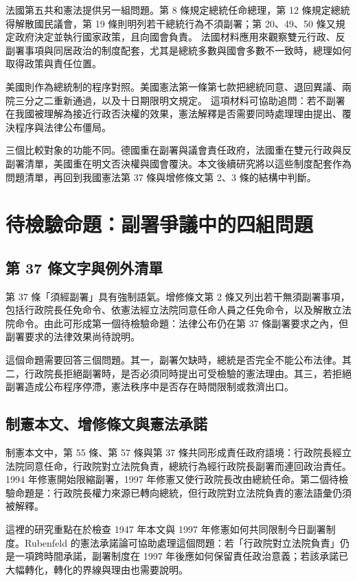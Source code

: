\documentclass[12pt]{ctexart}
\begin{document}
法國第五共和憲法提供另一組問題。第 8 條規定總統任命總理，第 12 條規定總統得解散國民議會，第 19 條則明列若干總統行為不須副署；第 20、49、50 條又規定政府決定並執行國家政策，且向國會負責。\autocite{elysee_constitution} 法國材料應用來觀察雙元行政、反副署事項與同居政治的制度配套，尤其是總統多數與國會多數不一致時，總理如何取得政策與責任位置。

美國則作為總統制的程序對照。美國憲法第一條第七款把總統同意、退回異議、兩院三分之二重新通過，以及十日期限明文規定。\autocite{loc_us_constitution_article1} 這項材料可協助追問：若不副署在我國被理解為接近行政否決權的效果，憲法解釋是否需要同時處理理由提出、覆決程序與法律公布僵局。

三個比較對象的功能不同。德國重在副署與議會責任政府，法國重在雙元行政與反副署清單，美國重在明文否決權與國會覆決。本文後續研究將以這些制度配套作為問題清單，再回到我國憲法第 37 條與增修條文第 2、3 條的結構中判斷。

\section{待檢驗命題：副署爭議中的四組問題}

\subsection{第 37 條文字與例外清單}

第 37 條「須經副署」具有強制語氣。增修條文第 2 條又列出若干無須副署事項，包括行政院長任免命令、依憲法經立法院同意任命人員之任免命令，以及解散立法院命令。由此可形成第一個待檢驗命題：法律公布仍在第 37 條副署要求之內，但副署要求的法律效果尚待說明。

這個命題需要回答三個問題。其一，副署欠缺時，總統是否完全不能公布法律。其二，行政院長拒絕副署時，是否必須同時提出可受檢驗的憲法理由。其三，若拒絕副署造成公布程序停滯，憲法秩序中是否存在時間限制或救濟出口。

\subsection{制憲本文、增修條文與憲法承諾}

制憲本文中，第 55 條、第 57 條與第 37 條共同形成責任政府語境：行政院長經立法院同意任命，行政院對立法院負責，總統行為經行政院長副署而連回政治責任。1994 年修憲開始限縮副署，1997 年修憲又使行政院長改由總統任命。第二個待檢驗命題是：行政院長權力來源已轉向總統，但行政院對立法院負責的憲法語彙仍須被解釋。

這裡的研究重點在於檢查 1947 年本文與 1997 年修憲如何共同限制今日副署制度。Rubenfeld 的憲法承諾論可協助處理這個問題：若「行政院對立法院負責」仍是一項跨時間承諾，副署制度在 1997 年後應如何保留責任政治意義；若該承諾已大幅轉化，轉化的界線與理由也需要說明。
\end{document}
